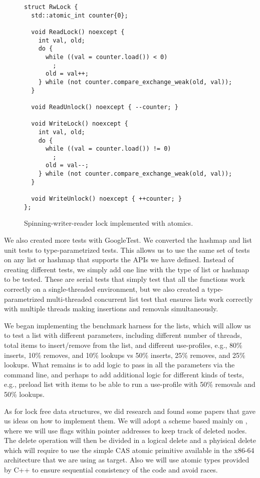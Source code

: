 \documentclass[11pt]{article}
\begin{document}
\begin{figure}
\begin{center}
\begin{lstlisting}
struct RwLock {
  std::atomic_int counter{0};

  void ReadLock() noexcept {
    int val, old;
    do {
      while ((val = counter.load()) < 0)
        ;
      old = val++;
    } while (not counter.compare_exchange_weak(old, val));
  }

  void ReadUnlock() noexcept { --counter; }

  void WriteLock() noexcept {
    int val, old;
    do {
      while ((val = counter.load()) != 0)
        ;
      old = val--;
    } while (not counter.compare_exchange_weak(old, val));
  }

  void WriteUnlock() noexcept { ++counter; }
};
\end{lstlisting}
\caption{Spinning-writer-reader lock implemented with atomics.}
\label{fig:rwlock}
\end{center}
\end{figure}

We also created more tests with GoogleTest. We converted the hashmap and list
unit tests to type-parametrized tests. This allows us to use the same set of
tests on any list or hashmap that supports the APIs we have defined. Instead of
creating different tests, we simply add one line with the type of list or
hashmap to be tested. These are serial tests that simply test that all the
functions work correctly on a single-threaded environment, but we also created a
type-parametrized multi-threaded concurrent list test that ensures lists work
correctly with multiple threads making insertions and removals simultaneously.

We began implementing the benchmark harness for the lists, which will allow us
to test a list with different parameters, including different number of threads,
total items to insert/remove from the list, and different use-profiles, e.g.,
80\% inserts, 10\% removes, and 10\% lookups vs 50\% inserts, 25\% removes, and
25\% lookups. What remains is to add logic to pass in all the parameters via the
command line, and perhaps to add additional logic for different kinds of tests,
e.g., preload list with items to be able to run a use-profile with 50\% removals
and 50\% lookups.

As for lock free data structures, we did research and found some papers that gave
us ideas on how to implement them. We will adopt a scheme based mainly on
\cite{Harris}, where we will use flags within pointer addresses to keep track of
deleted nodes. The delete operation will then be divided in a logical delete and 
a phyisical delete which will require to use the simple CAS atomic primitive available 
in the x86-64 architecture that we are using as target. Also we will
use atomic types provided by C++ to ensure sequential consistency of the code
and avoid races.
\end{document}
